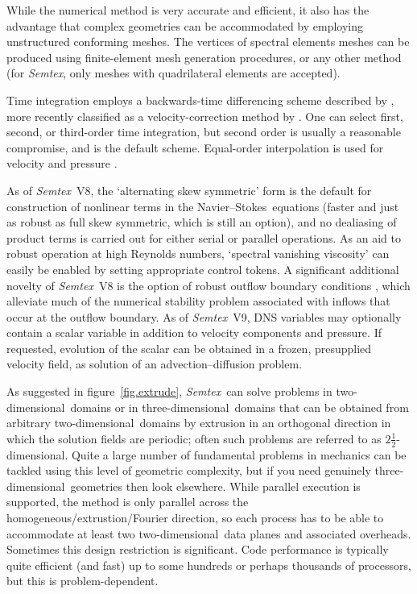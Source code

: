\documentclass[11pt]{report}
\newcommand{\Semtex}{\emph{Semtex}} \newcommand{\Dog}{\emph{Dog}}
\newcommand\twod{two-di\-men\-sion\-al}
\newcommand\threed{three-di\-men\-sion\-al}
\newcommand\NavSto{Navier--Stokes}
\begin{document}
While the numerical method is very accurate and efficient, it also has
the advantage that complex geometries can be accommodated by employing
unstructured conforming meshes.  The vertices of spectral elements
meshes can be produced using finite-element mesh generation
procedures, or any other method (for \Semtex, only meshes with
quadrilateral elements are accepted).

Time integration employs a backwards-time differencing scheme
described by \citet{kio91}, more recently classified as a
velocity-correction method by \citet{gush03}. One can select first,
second, or third-order time integration, but second order is usually a
reasonable compromise, and is the default scheme. Equal-order
interpolation is used for velocity and pressure
\citep[see][]{gms06}. 

As of \Semtex~V8, the `alternating skew symmetric' form \citep{zan91b}
is the default for construction of nonlinear terms in the
\NavSto\ equations (faster and just as robust as full skew symmetric,
which is still an option), and no dealiasing of product terms is
carried out for either serial or parallel operations.  As an aid to
robust operation at high Reynolds numbers, `spectral vanishing
viscosity' \citep{xupa04} can easily be enabled by setting appropriate
control tokens.
%
A significant additional novelty of \Semtex~V8 is the option of robust
outflow boundary conditions \citep{dkc14}, which alleviate much of the
numerical stability problem associated with inflows that occur at the
outflow boundary.
%
As of \Semtex~V9, DNS variables may optionally contain a scalar
variable in addition to velocity components and pressure.  If
requested, evolution of the scalar can be obtained in a frozen,
presupplied velocity field, \ie as solution of an advection--diffusion
problem.

As suggested in figure~\ref{fig.extrude}, \Semtex\ can solve problems
in \twod\ domains or in \threed\ domains that can be obtained from
arbitrary \twod\ domains by extrusion in an orthogonal direction in
which the solution fields are periodic; often such problems are
referred to as $2\tfrac{1}{2}$-dimensional.  Quite a large number of
fundamental problems in mechanics can be tackled using this level of
geometric complexity, but if you need genuinely \threed\ geometries
then look elsewhere.  While parallel execution is supported, the
method is only parallel across the homogeneous/extrustion/Fourier
direction, so each process has to be able to accommodate at least two
\twod\ data planes and associated overheads.  Sometimes this design
restriction is significant.  Code performance is typically quite
efficient (and fast) up to some hundreds or perhaps thousands of
processors, but this is problem-dependent.
\end{document}
